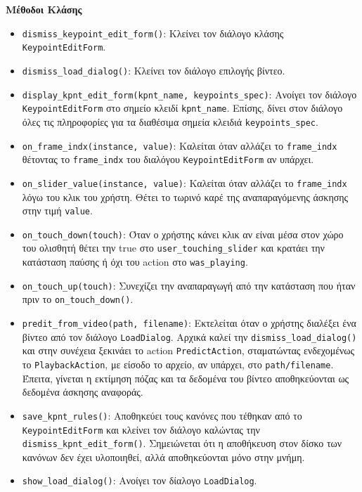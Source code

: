\noindent\textbf{Μέθοδοι Κλάσης}
\begin{itemize}
	\item \texttt{dismiss\_keypoint\_edit\_form()}: Κλείνει τον διάλογο κλάσης \texttt{KeypointEditForm}.
	\item \texttt{dismiss\_load\_dialog()}: Κλείνει τον διάλογο επιλογής βίντεο.
	\item \texttt{display\_kpnt\_edit\_form(kpnt\_name, keypoints\_spec)}: Ανοίγει τον διάλογο \texttt{KeypointEditForm} στο σημείο κλειδί \texttt{kpnt\_name}. Επίσης, δίνει στον διάλογο όλες τις πληροφορίες για τα διαθέσιμα σημεία κλειδιά \texttt{keypoints\_spec}.
	\item \texttt{on\_frame\_indx(instance, value)}: Καλείται όταν αλλάζει το \texttt{frame\_indx} θέτοντας το \texttt{frame\_indx} του διαλόγου \texttt{KeypointEditForm} αν υπάρχει.
	\item \texttt{on\_slider\_value(instance, value)}: Καλείται όταν αλλάζει το \texttt{frame\_indx} λόγω του κλικ του χρήστη. Θέτει το τωρινό καρέ της αναπαραγόμενης άσκησης στην τιμή \texttt{value}.
	\item \texttt{on\_touch\_down(touch)}: Όταν ο χρήστης κάνει κλικ αν είναι μέσα στον χώρο του ολισθητή θέτει την true στο \texttt{user\_touching\_slider} και κρατάει την κατάσταση παύσης ή όχι του action στο \texttt{was\_playing}.
	\item \texttt{on\_touch\_up(touch)}: Συνεχίζει την αναπαραγωγή από την κατάσταση που ήταν πριν το \texttt{on\_touch\_down()}.
	\item \texttt{predit\_from\_video(path, filename)}: Εκτελείται όταν ο χρήστης διαλέξει ένα βίντεο από τον διάλογο \texttt{LoadDialog}. Αρχικά καλεί την \texttt{dismiss\_load\_dialog()} και στην συνέχεια ξεκινάει το action \texttt{PredictAction}, σταματώντας ενδεχομένως το \texttt{PlaybackAction}, με είσοδο το αρχείο, αν υπάρχει, στο \texttt{path/filename}. Έπειτα, γίνεται η εκτίμηση πόζας και τα δεδομένα του βίντεο αποθηκεύονται ως δεδομένα άσκησης αναφοράς.
	\item \texttt{save\_kpnt\_rules()}: Αποθηκεύει τους κανόνες που τέθηκαν από το \texttt{KeypointEditForm} και κλείνει τον διάλογο καλώντας την \texttt{dismiss\_kpnt\_edit\_form()}. Σημειώνεται ότι η αποθήκευση στον δίσκο των κανόνων δεν έχει υλοποιηθεί, αλλά αποθηκεύονται μόνο στην μνήμη.
	\item \texttt{show\_load\_dialog()}: Ανοίγει τον δίαλογο \texttt{LoadDialog}. 
\end{itemize}

